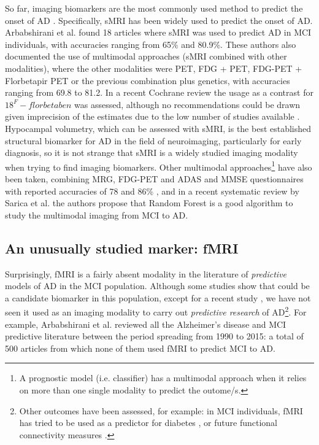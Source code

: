 \documentclass[a4paper,12pt]{elsarticle}  %
\begin{document}
  	So far, imaging biomarkers are the most commonly used method to predict the onset of AD \cite{Dallora2017}. Specifically, sMRI has been widely used to predict the onset of AD. Arbabshirani et al. \cite{Arbabshirani2017137} found 18 articles where sMRI was used to predict AD in MCI individuals, with accuracies ranging from 65\% and 80.9\%. These authors also documented the use of multimodal approaches (sMRI combined with other modalities), where the other modalities were PET, FDG + PET, FDG-PET + Florbetapir PET or the previous combination plus genetics, with accuracies ranging from 69.8 to 81.2. In a recent Cochrane review the usage as a contrast for ${18}^F-florbetaben$ was assessed, although no recommendations could be drawn given imprecision of the estimates due to the low number of studies available \cite{Martinez2017}. Hypocampal volumetry, which can be assessed with sMRI, is the best established structural biomarker for AD in the field of neuroimaging, particularly for early diagnosis\cite{Henriques2018}, so it is not strange that sMRI is a widely studied imaging modality when trying to find imaging biomarkers. Other multimodal approaches\footnote{A prognostic model (i.e. classifier) has a multimodal approach when it relies on more than one single modality to predict the outome/s.} have also been taken, combining MRG, FDG-PET and ADAS and MMSE questionnaires with reported accuracies of 78 and 86\% \cite{Liu201856}, and in a recent systematic review by Sarica et al. \cite{Sarica2017} the authors propose that Random Forest is a good algorithm to study the multimodal imaging from MCI to AD.
  	


\subsection{An unusually studied marker: fMRI} %

	Surprisingly, fMRI is a fairly absent modality in the literature of \textit{predictive} models of AD in the MCI population. Although some studies show that could be a candidate biomarker in this population, except for a recent study \cite{Hojjati201769}, we have not seen it used as an imaging modality to carry out \textit{predictive research} of AD\footnote{Other outcomes have been assessed, for example: in MCI individuals, fMRI has tried to be used as a predictor for diabetes \cite{Yu2016}, or future functional connectivity measures \cite{Dai2017772}.}. For example, Arbabshirani et al. \cite{Arbabshirani2017137} reviewed all the 
	Alzheimer's disease and MCI predictive literature between the period spreading from 1990 to 2015: a total of 500 articles from which none of them used fMRI to predict MCI to AD.
	
\end{document}
